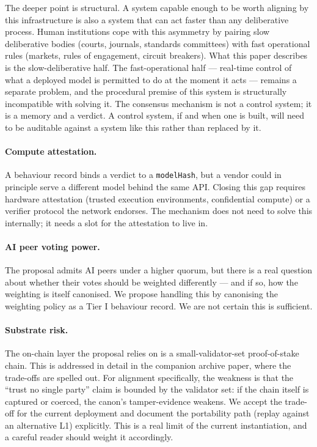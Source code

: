 \documentclass[11pt,a4paper]{article}
\begin{document}
The deeper point is structural. A system capable enough to be
worth aligning by this infrastructure is also a system that can
act faster than any deliberative process. Human institutions
cope with this asymmetry by pairing slow deliberative bodies
(courts, journals, standards committees) with fast operational
rules (markets, rules of engagement, circuit breakers). What
this paper describes is the slow-deliberative half. The
fast-operational half --- real-time control of what a deployed
model is permitted to do at the moment it acts --- remains a
separate problem, and the procedural premise of this system is
structurally incompatible with solving it. The consensus
mechanism is not a control system; it is a memory and a
verdict. A control system, if and when one is built, will need
to be auditable against a system like this rather than replaced
by it.

\paragraph{Compute attestation.} A behaviour record binds a
verdict to a \texttt{modelHash}, but a vendor could in principle
serve a different model behind the same API. Closing this gap
requires hardware attestation (trusted execution environments,
confidential compute) or a verifier protocol the network
endorses. The mechanism does not need to solve this internally;
it needs a slot for the attestation to live in.

\paragraph{AI peer voting power.} The proposal admits AI peers
under a higher quorum, but there is a real question about
whether their votes should be weighted differently --- and if
so, how the weighting is itself canonised. We propose handling
this by canonising the weighting policy as a Tier I behaviour
record. We are not certain this is sufficient.

\paragraph{Substrate risk.} The on-chain layer the proposal
relies on is a small-validator-set proof-of-stake chain. This is
addressed in detail in the companion archive paper, where the
trade-offs are spelled out. For alignment specifically, the
weakness is that the ``trust no single party'' claim is bounded
by the validator set: if the chain itself is captured or
coerced, the canon's tamper-evidence weakens. We accept the
trade-off for the current deployment and document the
portability path (replay against an alternative L1) explicitly.
This is a real limit of the current instantiation, and a careful
reader should weight it accordingly.
\end{document}
